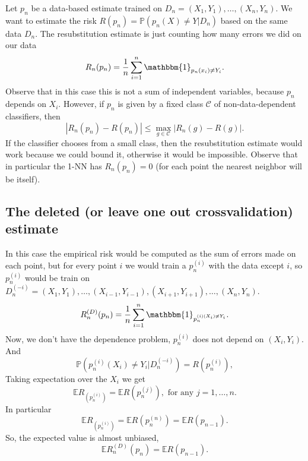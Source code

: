 \documentclass[11pt, english]{article}
\begin{document}
Let $p_n$ be a data-based estimate trained on $D_n=(X_1,Y_1),\dots,(X_n,Y_n)$. We want to estimate the risk $R(p_n)=\mathbb{P}(p_n(X)\neq Y|D_n)$ based on the same data $D_n$. The resubstitution estimate is just counting how many errors we did on our data
\begin{equation}
	R_n(p_n)=\frac{1}{n}\sum\limits_{i=1}^n\mathbbm{1}_{p_n(x_i)\neq Y_i}.
\end{equation}
Observe that in this case this is not a sum of independent variables, because $p_n$ depends on $X_i$. However, if $p_n$ is given by a fixed class $\mathcal{C}$ of non-data-dependent classifiers, then 
\begin{equation}
	|R_n(p_n)-R(p_n)|\leq\underset{g\in\mathcal{C}}{\max}|R_n(g)-R(g)|.
\end{equation}
If the classifier chooses from a small class, then the resubstitution estimate would work because we could bound it, otherwise it would be impossible. Observe that in particular the 1-NN has $R_n(p_n)=0$ (for each point the nearest neighbor will be itself).

\subsection{The deleted (or leave one out crossvalidation) estimate}

In this case the empirical risk would be computed as the sum of errors made on each point, but for every point $i$ we would train a $p_n^{(i)}$ with the data except $i$, so $p_n^{(i)}$ would be train on $D_n^{(-i)}=(X_1,Y_1),\dots,(X_{i-1},Y_{i-1}), (X_{i+1},Y_{i+1}),\dots,(X_n,Y_n)$.
\begin{equation}
	R_n^{(D)}(p_n)=\frac{1}{n}\sum\limits_{i=1}^n\mathbbm{1}
_{p_n^{(i)(X_i)\neq Y_i}}.
\end{equation}
Now, we don't have the dependence problem, $p_n^(i)$ does not depend on $(X_i,Y_i)$. And
\begin{equation}
	\mathbb{P}(p_n^{(i)}(X_i)\neq Y_i|D_n^(-i))=R(p_n^(i)),
\end{equation}
Taking expectation over the $X_i$ we get
\begin{equation}
	\mathbb{E}R_(p_n^{(i)})=\mathbb{E}R(p_n^(j)),\text{ for any }j=1,\dots,n.
\end{equation}
In particular 
\begin{equation}
	\mathbb{E}R_(p_n^{(i)})=\mathbb{E}R(p_n^(n))=\mathbb{E}R(p_{n-1}).
\end{equation}
So, the expected value is almost unbiased, 
\begin{equation}
	\mathbb{E}R_n^(D)(p_n)=\mathbb{E}R(p_{n-1}).
\end{equation}
\end{document}
